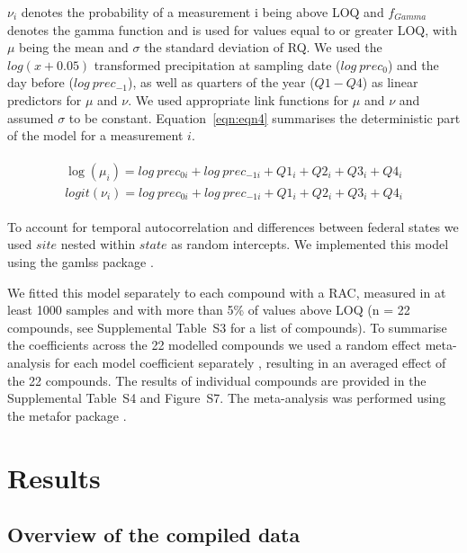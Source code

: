 $\nu_i$ denotes the probability of a measurement i being above LOQ and $f_{Gamma}$ denotes the gamma function and is used for values equal to or greater LOQ, with $\mu$ being the mean and $\sigma$ the standard deviation of RQ.
We used the $log(x+0.05)$ transformed precipitation at sampling date ($log~prec_0$) and the day before ($log~prec_{-1}$), as well as quarters of the year ($Q1-Q4$) as linear predictors for $\mu$ and $\nu$. 
We used appropriate link functions for $\mu$ and $\nu$ and assumed $\sigma$ to be constant. 
Equation~\ref{eqn:eqn4} summarises the deterministic part of the model for a measurement $i$.

\begin{align}
\begin{split}
\log(\mu_{i}) = log~prec_{0 i} + log~prec_{-1 i} + Q1_{i} + Q2_{i}+Q3_{i}+Q4_{i}\\
logit(\nu_{i}) = log~prec_{0 i} + log~prec_{-1 i} + Q1_{i} + Q2_{i}+Q3_{i}+Q4_{i}
\end{split}
\label{eqn:eqn4}
\end{align}

To account for temporal autocorrelation and differences between federal states we used $site$ nested within $state$ as random intercepts.
We implemented this model using the gamlss package \citep{stasinopoulos_generalized_2007}. 

We fitted this model separately to each compound with a RAC, measured in at least 1000 samples and with more than 5\% of values above LOQ (n = 22 compounds, see Supplemental Table~S3 for a list of compounds). 
To summarise the coefficients across the 22 modelled compounds we used a random effect meta-analysis for each model coefficient separately \citep{harrison_getting_2011}, resulting in an averaged effect of the 22 compounds.
The results of individual compounds are provided in the Supplemental Table~S4 and Figure~S7.
The meta-analysis was performed using the metafor package \citep{Viechtbauer_2010}. 



\section{Results}
\subsection{Overview of the compiled data}

